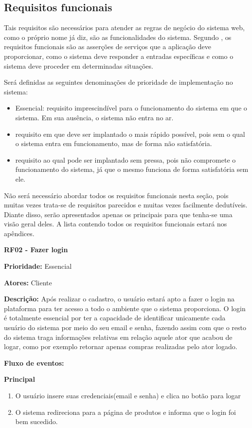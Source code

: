 \subsection{Requisitos funcionais}

Tais requisitos são necessários para atender as regras de negócio do sistema web, como o próprio nome já diz, são as funcionalidades do sistema.  Segundo \cite{sommerville2007engenharia}, os requisitos funcionais são as asserções de serviços que a aplicação deve proporcionar, como o sistema deve responder a entradas específicas e como o sistema deve proceder em determinadas situações. \par
Será definidas as seguintes denominações de prioridade de implementação no sistema:
\begin{itemize}  
\item Essencial: requisito imprescindível para o funcionamento do sistema em que o sistema. Em sua ausência, o sistema não entra no ar.
\item requisito em que deve ser implantado o mais rápido possível, pois sem o qual o sistema entra em funcionamento, mas de forma não satisfatória.
\item requisito ao qual pode ser implantado sem pressa, pois não compromete o funcionamento do sistema, já que o mesmo funciona de forma satisfatória sem ele.
\end{itemize} \par
Não será necessário abordar todos os requisitos funcionais nesta seção, pois muitas vezes trata-se de requisitos parecidos e muitas vezes facilmente dedutíveis. Diante disso, serão apresentados apenas os principais para que tenha-se uma visão geral deles. A lista contendo todos os requisitos funcionais estará nos apêndices.

\textbf{RF02 - Fazer login} \par
\textbf{Prioridade:} Essencial \par
\textbf{Atores:} Cliente \par
\textbf{Descrição:} Após realizar o cadastro, o usuário estará apto a fazer o login na plataforma para ter acesso a todo o ambiente que o sistema proporciona. O login é totalmente essencial por ter a capacidade de identificar unicamente cada usuário do sistema por meio do seu email e senha, fazendo assim com que o resto do sistema traga informações relativas em relação aquele ator que acabou de logar, como por exemplo retornar apenas compras realizadas pelo ator logado. \par
\textbf{Fluxo de eventos:} \par
\textbf{Principal} \par
\begin{enumerate}
  \item O usuário insere suas credenciais(email e senha) e clica no botão para logar
  \item O sistema redireciona para a página de produtos e informa que o login foi bem sucedido.
\end{enumerate}

